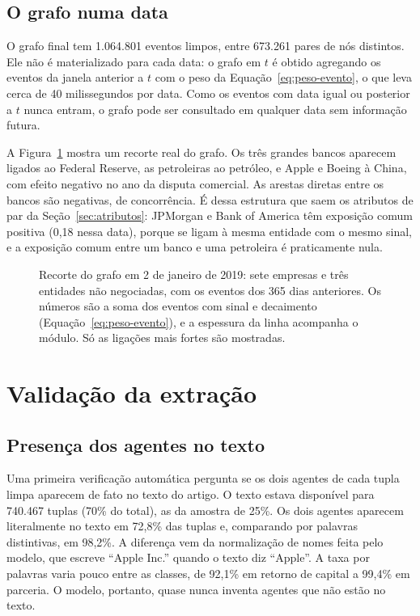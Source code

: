 \subsection{O grafo numa data}

O grafo final tem 1.064.801 eventos limpos, entre 673.261 pares de nós distintos. Ele não é
materializado para cada data: o grafo em $t$ é obtido agregando os eventos da janela anterior a $t$
com o peso da Equação~\eqref{eq:peso-evento}, o que leva cerca de 40 milissegundos por data. Como os
eventos com data igual ou posterior a $t$ nunca entram, o grafo pode ser consultado em qualquer data sem
informação futura.

A Figura~\ref{fig:grafo-exemplo} mostra um recorte real do grafo. Os três grandes bancos aparecem ligados
ao Federal Reserve, as petroleiras ao petróleo, e Apple e Boeing à China, com efeito negativo no ano da
disputa comercial. As arestas diretas entre os bancos são negativas, de concorrência. É dessa estrutura
que saem os atributos de par da Seção~\ref{sec:atributos}: JPMorgan e Bank of America têm exposição
comum positiva (0,18 nessa data), porque se ligam à mesma entidade com o mesmo sinal, e a exposição comum
entre um banco e uma petroleira é praticamente nula.

\begin{figure}[htbp]
\centering

\caption{Recorte do grafo em 2 de janeiro de 2019: sete empresas e três entidades não negociadas, com os
eventos dos 365 dias anteriores. Os números são a soma dos eventos com sinal e decaimento
(Equação~\ref{eq:peso-evento}), e a espessura da linha acompanha o módulo. Só as ligações mais fortes são
mostradas.}
\label{fig:grafo-exemplo}
\end{figure}

\section{Validação da extração}
\label{sec:validacao}

\subsection{Presença dos agentes no texto}

Uma primeira verificação automática pergunta se os dois agentes de cada tupla limpa aparecem de fato
no texto do artigo. O texto estava disponível para 740.467 tuplas (70\% do total), as da amostra de
25\%. Os dois agentes aparecem literalmente no texto em 72,8\% das tuplas e, comparando por palavras
distintivas, em 98,2\%. A diferença vem da normalização de nomes feita pelo modelo, que escreve ``Apple
Inc.'' quando o texto diz ``Apple''. A taxa por palavras varia pouco entre as classes, de 92,1\% em
retorno de capital a 99,4\% em parceria. O modelo, portanto, quase nunca inventa agentes que não estão
no texto.

